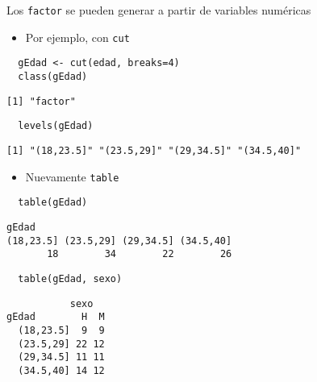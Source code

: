 \documentclass[xcolor={usenames,svgnames,dvipsnames}]{beamer}
\begin{document}
\begin{frame}[fragile,label={sec:org9e98f84}]{Los \texttt{factor} se pueden generar a partir de variables numéricas}
 \begin{itemize}
\item Por ejemplo, con \texttt{cut}
\end{itemize}
\lstset{language=r,label= ,caption= ,captionpos=b,numbers=none}
\begin{lstlisting}
  gEdad <- cut(edad, breaks=4)
  class(gEdad)
\end{lstlisting}

\begin{verbatim}
[1] "factor"
\end{verbatim}

\lstset{language=r,label= ,caption= ,captionpos=b,numbers=none}
\begin{lstlisting}
  levels(gEdad)
\end{lstlisting}

\begin{verbatim}
[1] "(18,23.5]" "(23.5,29]" "(29,34.5]" "(34.5,40]"
\end{verbatim}

\begin{itemize}
\item Nuevamente \texttt{table}
\end{itemize}
\lstset{language=r,label= ,caption= ,captionpos=b,numbers=none}
\begin{lstlisting}
  table(gEdad)
\end{lstlisting}

\begin{verbatim}
gEdad
(18,23.5] (23.5,29] (29,34.5] (34.5,40] 
       18        34        22        26
\end{verbatim}

\lstset{language=r,label= ,caption= ,captionpos=b,numbers=none}
\begin{lstlisting}
  table(gEdad, sexo)
\end{lstlisting}

\begin{verbatim}
           sexo
gEdad        H  M
  (18,23.5]  9  9
  (23.5,29] 22 12
  (29,34.5] 11 11
  (34.5,40] 14 12
\end{verbatim}
\end{frame}
\end{document}
